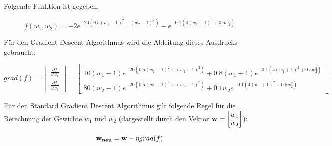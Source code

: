 Folgende Funktion ist gegeben:

$$ f(w_1, w_2) = -2 e^{-20(0.5(w_1-1)^2+(w_2-1)^2)} - e^{-0.1(4(w_1+1)^2 + 0.5w_2^2)} $$

Für den Gradient Descent Algorithmus wird die Ableitung dieses Ausdrucks gebraucht:

$$ grad(f) = \begin{bmatrix} \frac{\partial f}{\partial w_1} \\ \frac{\partial f}{\partial w_2} \end{bmatrix} = \begin{bmatrix} 40 (w_1 - 1) e^{-20(0.5(w_1-1)^2+(w_2-1)^2)} + 0.8 (w_1 + 1) e^{-0.1(4(w_1+1)^2 + 0.5w_2^2)} \\ 80 (w_2 - 1) e^{-20(0.5(w_1-1)^2+(w_2-1)^2)} + 0.1 w_2 e^{-0.1(4(w_1+1)^2 + 0.5w_2^2)} \end{bmatrix} $$

Für den Standard Gradient Descent Algorithmus gilt folgende Regel für die Berechnung der Gewichte $w_1$ und $w_2$ (dargestellt durch den Vektor $ \mathbf{w} = \begin{bmatrix} w_1 \\ w_2 \end{bmatrix} $):

$$ \mathbf{w_{neu}} = \mathbf{w} - \eta grad(f) $$

